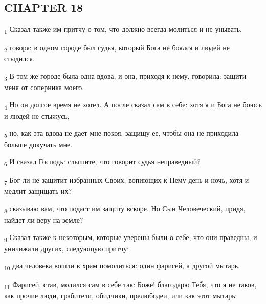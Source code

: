 \subsection{CHAPTER 18}
\begin{tcolorbox}
\textsubscript{1} Сказал также им притчу о том, что должно всегда молиться и не унывать,
\end{tcolorbox}
\begin{tcolorbox}
\textsubscript{2} говоря: в одном городе был судья, который Бога не боялся и людей не стыдился.
\end{tcolorbox}
\begin{tcolorbox}
\textsubscript{3} В том же городе была одна вдова, и она, приходя к нему, говорила: защити меня от соперника моего.
\end{tcolorbox}
\begin{tcolorbox}
\textsubscript{4} Но он долгое время не хотел. А после сказал сам в себе: хотя я и Бога не боюсь и людей не стыжусь,
\end{tcolorbox}
\begin{tcolorbox}
\textsubscript{5} но, как эта вдова не дает мне покоя, защищу ее, чтобы она не приходила больше докучать мне.
\end{tcolorbox}
\begin{tcolorbox}
\textsubscript{6} И сказал Господь: слышите, что говорит судья неправедный?
\end{tcolorbox}
\begin{tcolorbox}
\textsubscript{7} Бог ли не защитит избранных Своих, вопиющих к Нему день и ночь, хотя и медлит защищать их?
\end{tcolorbox}
\begin{tcolorbox}
\textsubscript{8} сказываю вам, что подаст им защиту вскоре. Но Сын Человеческий, придя, найдет ли веру на земле?
\end{tcolorbox}
\begin{tcolorbox}
\textsubscript{9} Сказал также к некоторым, которые уверены были о себе, что они праведны, и уничижали других, следующую притчу:
\end{tcolorbox}
\begin{tcolorbox}
\textsubscript{10} два человека вошли в храм помолиться: один фарисей, а другой мытарь.
\end{tcolorbox}
\begin{tcolorbox}
\textsubscript{11} Фарисей, став, молился сам в себе так: Боже! благодарю Тебя, что я не таков, как прочие люди, грабители, обидчики, прелюбодеи, или как этот мытарь:
\end{tcolorbox}
